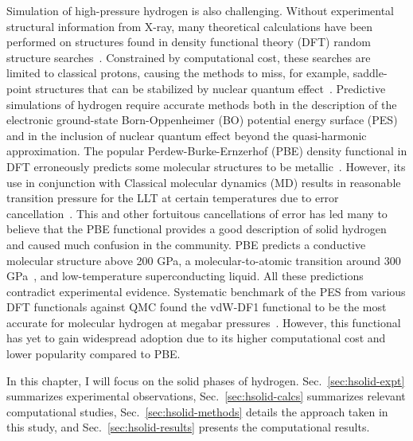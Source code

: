 Simulation of high-pressure hydrogen is also challenging. Without experimental structural information from X-ray, many theoretical calculations have been performed on structures found in density functional theory (DFT) random structure searches~\cite{Pickard2007}. Constrained by computational cost, these searches are limited to classical protons, causing the methods to miss, for example, saddle-point structures that can be stabilized by nuclear quantum effect~\cite{Monserrat2016}.
Predictive simulations of hydrogen require accurate methods both in the description of the electronic ground-state Born-Oppenheimer (BO) potential energy surface (PES) and in the inclusion of nuclear quantum effect beyond the quasi-harmonic approximation.
The popular Perdew-Burke-Ernzerhof (PBE) density functional in DFT erroneously predicts some molecular structures to be metallic~\cite{Drummond2015}. However, its use in conjunction with Classical molecular dynamics (MD) results in reasonable transition pressure for the LLT at certain temperatures due to error cancellation~\cite{Morales2013a}.
This and other fortuitous cancellations of error has led many to believe that the PBE functional provides a good description of solid hydrogen and caused much confusion in the community. PBE predicts a conductive molecular structure above 200 GPa, a molecular-to-atomic transition around 300 GPa~\cite{McMinis2015}, and low-temperature superconducting liquid. All these predictions contradict experimental evidence. Systematic benchmark of the PES from various DFT functionals against QMC found the vdW-DF1 functional to be the most accurate for molecular hydrogen at megabar pressures~\cite{Clay2016}. However, this functional has yet to gain widespread adoption due to its higher computational cost and lower popularity compared to PBE.

In this chapter, I will focus on the solid phases of hydrogen. Sec.~\ref{sec:hsolid-expt} summarizes experimental observations, Sec.~\ref{sec:hsolid-calcs} summarizes relevant computational studies,
Sec.~\ref{sec:hsolid-methods} details the approach taken in this study,
and Sec.~\ref{sec:hsolid-results} presents the computational results.

